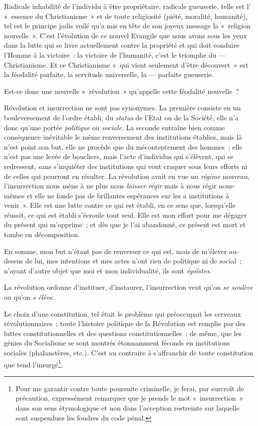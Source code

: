 \documentclass[french,twoside]{book} %
\begin{document}
Radicale inhabilité de l’individu à être propriétaire, radicale gueuserie, telle est l’ « essence du Christianisme » et de toute religiosité (piété, moralité, humanité), tel est le principe jadis voilé qu’a mis en tête de son joyeux message la « religion nouvelle ». C’est l’évolution de ce nouvel Evangile que nous avons sous les yeux dans la lutte qui se livre actuellement contre la propriété et qui doit conduire l’Homme à la victoire : la victoire de l’humanité, c’est le triomphe du — Christianisme. Et ce Christianisme « qui vient seulement d’être découvert » est la féodalité parfaite, la servitude universelle, la — parfaite gueuserie.\par
Est-ce donc une nouvelle « révolution » qu’appelle cette féodalité nouvelle ?\par
Révolution et insurrection ne sont pas synonymes. La première consiste en un bouleversement de l’ordre établi, du \emph{status} de l’Etat ou de la Société, elle n’a donc qu’une portée \emph{politique} ou \emph{sociale.} La seconde entraîne bien comme conséquence inévitable le même renversement des institutions établies, mais là n’est point son but, elle ne procède que du mécontentement des hommes ; elle n’est pas une levée de boucliers, mais l’acte d’individus qui s’élèvent, qui se redressent, sans s’inquiéter des institutions qui vont craquer sous leurs efforts ni de celles qui pourront en résulter. La révolution  avait en vue un \emph{régime} nouveau, l’insurrection nous mène à ne plus nous \emph{laisser régir} mais à nous régir nous-mêmes et elle ne fonde pas de brillantes espérances sur les a institutions à venir ». Elle est une lutte contre ce qui est établi, en ce sens que, lorsqu’elle réussit, ce qui est établi s’écroule tout seul. Elle est mon effort pour me dégager du présent qui m’opprime ; et dès que je l’ai abandonné, ce présent est mort et tombe en décomposition.\par
En somme, mon but n’étant pas de renverser ce qui est, mais de m’élever au-dessus de lui, mes intentions et mes actes n’ont rien de politique ni de social ; n’ayant d’autre objet que moi et mon individualité, ils sont \emph{égoïstes}.\par
La révolution ordonne d’instituer, d’instaurer, l’insurrection veut qu’on \emph{se soulève} ou qu’on \emph{s élève.}\par
Le choix d’une constitution, tel était le problème qui préoccupait les cerveaux révolutionnaires ; toute l’histoire politique de la Révolution est remplie par des luttes constitutionnelles et des questions constitutionnelles ; de même, que les génies du Socialisme se sont montrés étonnamment féconds en institutions sociales (phalanstères, etc.). C’est au contraire à s’affranchir de toute constitution que tend l’insurgé\footnote{ \noindent Pour me garantir contre toute poursuite criminelle, je ferai, par surcroît de précaution, expressément remarquer que je prends le mot « insurrection » dans son sens étymologique et non dans l’acception restreinte sur laquelle sont suspendues les foudres du code pénal.
 }.\par
\end{document}
